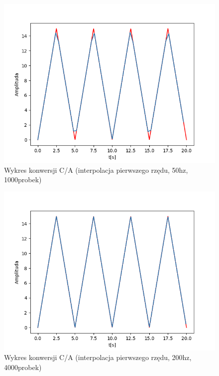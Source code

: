 \documentclass[12pt]{article}
\begin{document}
\begin{figure}[H]
\centering
\includegraphics[scale=0.6]{8trojkatInterp1rzedu50.png}
\caption{Wykres konwersji C/A (interpolacja pierwszego rzędu, 50hz, 1000probek)}
\end{figure}

\begin{figure}[H]
\centering
\includegraphics[scale=0.6]{8trojkatInterp1rzedu200.png}
\caption{Wykres konwersji C/A (interpolacja pierwszego rzędu, 200hz, 4000probek)}
\end{figure}
\end{document}

